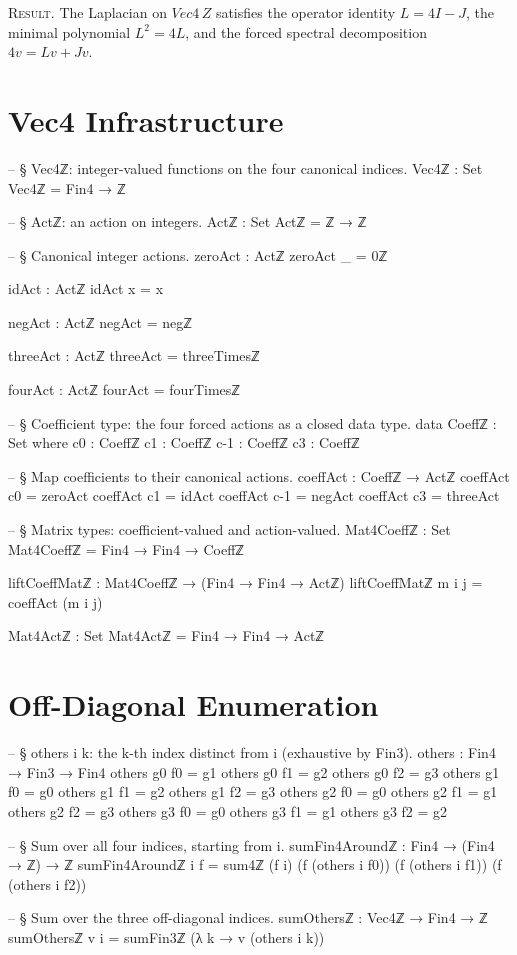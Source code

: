 \documentclass[11pt,a4paper]{book}
\def\mathrm#1{#1}%
\def\mathbb#1{#1}%
\begin{document}
\textsc{Result.}
The Laplacian on $\mathrm{Vec4}\,\mathbb{Z}$ satisfies the operator identity
$L = 4I - J$, the minimal polynomial $L^2 = 4L$, and the forced spectral
decomposition $4v = Lv + Jv$.

\section{Vec4 Infrastructure}

\begin{code}
-- § Vec4ℤ: integer-valued functions on the four canonical indices.
Vec4ℤ : Set
Vec4ℤ = Fin4 → ℤ

-- § Actℤ: an action on integers.
Actℤ : Set
Actℤ = ℤ → ℤ

-- § Canonical integer actions.
zeroAct : Actℤ
zeroAct _ = 0ℤ

idAct : Actℤ
idAct x = x

negAct : Actℤ
negAct = negℤ

threeAct : Actℤ
threeAct = threeTimesℤ

fourAct : Actℤ
fourAct = fourTimesℤ

-- § Coefficient type: the four forced actions as a closed data type.
data Coeffℤ : Set where
  c0  : Coeffℤ
  c1  : Coeffℤ
  c-1 : Coeffℤ
  c3  : Coeffℤ

-- § Map coefficients to their canonical actions.
coeffAct : Coeffℤ → Actℤ
coeffAct c0 = zeroAct
coeffAct c1 = idAct
coeffAct c-1 = negAct
coeffAct c3 = threeAct

-- § Matrix types: coefficient-valued and action-valued.
Mat4Coeffℤ : Set
Mat4Coeffℤ = Fin4 → Fin4 → Coeffℤ

liftCoeffMatℤ : Mat4Coeffℤ → (Fin4 → Fin4 → Actℤ)
liftCoeffMatℤ m i j = coeffAct (m i j)

Mat4Actℤ : Set
Mat4Actℤ = Fin4 → Fin4 → Actℤ
\end{code}

\section{Off-Diagonal Enumeration}

\begin{code}
-- § others i k: the k-th index distinct from i (exhaustive by Fin3).
others : Fin4 → Fin3 → Fin4
others g0 f0 = g1
others g0 f1 = g2
others g0 f2 = g3
others g1 f0 = g0
others g1 f1 = g2
others g1 f2 = g3
others g2 f0 = g0
others g2 f1 = g1
others g2 f2 = g3
others g3 f0 = g0
others g3 f1 = g1
others g3 f2 = g2

-- § Sum over all four indices, starting from i.
sumFin4Aroundℤ : Fin4 → (Fin4 → ℤ) → ℤ
sumFin4Aroundℤ i f = sum4ℤ (f i) (f (others i f0)) (f (others i f1)) (f (others i f2))

-- § Sum over the three off-diagonal indices.
sumOthersℤ : Vec4ℤ → Fin4 → ℤ
sumOthersℤ v i = sumFin3ℤ (λ k → v (others i k))
\end{code}
\end{document}

